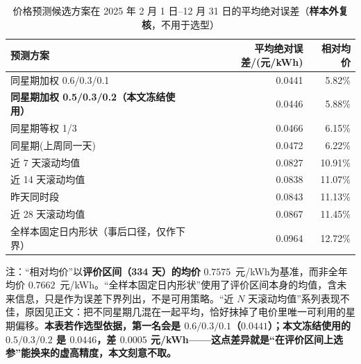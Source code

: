 \begin{table}[htbp]
  \centering
  \caption{价格预测候选方案在 2025 年 2 月 1 日--12 月 31 日的平均绝对误差（\textbf{样本外复核}，不用于选型）}
  \label{tab:p4-forecast}
  \footnotesize
  \begin{tabular}{lrr}
    \toprule
    预测方案 & 平均绝对误差/(元/kWh) & 相对均价 \\
    \midrule
    同星期加权 0.6/0.3/0.1 & 0.0441 & 5.82\% \\
    \textbf{同星期加权 0.5/0.3/0.2（本文冻结使用）} & 0.0446 & 5.88\% \\
    同星期等权 1/3 & 0.0466 & 6.15\% \\
    同星期(上周同一天) & 0.0472 & 6.22\% \\
    近 7 天滚动均值 & 0.0827 & 10.91\% \\
    近 14 天滚动均值 & 0.0838 & 11.07\% \\
    昨天同时段 & 0.0843 & 11.13\% \\
    近 28 天滚动均值 & 0.0867 & 11.45\% \\
    全样本固定日内形状（事后口径，仅作下界） & 0.0964 & 12.72\% \\
    \bottomrule
  \end{tabular}
  \par\vspace{2pt}
  \begin{minipage}{.92\textwidth}\footnotesize
    注：``相对均价''以\textbf{评价区间（334 天）的均价} $0.7575$~元/kWh为基准，而非全年均价 $0.7662$~元/kWh。``全样本固定日内形状''使用了评价区间本身的均值，含未来信息，只是作为误差下界列出，不是可用策略。``近 $N$ 天滚动均值''系列表现不佳，原因见正文：把不同星期几混在一起平均，恰好抹掉了电价里唯一可利用的星期偏移。\textbf{本表若作选型依据，第一名会是 $0.6/0.3/0.1$（$0.0441$）；本文冻结使用的 $0.5/0.3/0.2$ 是 $0.0446$，差 $0.0005$ 元/kWh——这点差异就是``在评价区间上选参''能换来的虚高精度，本文刻意不取。}
  \end{minipage}
\end{table}


